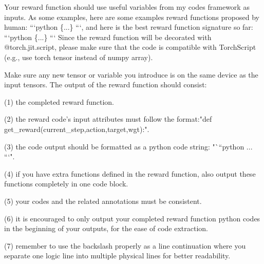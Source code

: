 \documentclass[11pt]{article}
\begin{document}
\begin{tcolorbox}[title=Prompt 2: Code Generation Instruction Prompts, colframe=blue, colback=white, breakable]

Your reward function should use useful variables from my codes framework as inputs. As some examples,
here are some examples reward functions proposed by human: ```python \{...\} ```,
and here is the best reward function signature so far: ```python \{...\} ```
Since the reward function will be decorated with @torch.jit.script,
please make sure that the code is compatible with TorchScript (e.g., use torch tensor instead of numpy array). 

Make sure any new tensor or variable you introduce is on the same device as the input tensors. 
The output of the reward function should consist:

    (1) the completed reward function.
    
    (2) the reward code's input attributes must follow the format:"def get\_reward(current\_step,action,target,wgt):".
    
    (3) the code output should be formatted as a python code string: "```python ... ```".
    
    (4) if you have extra functions defined in the reward function, also output these functions completely in one code block.
    
    (5) your codes and the related annotations must be consistent.
    
    (6) it is encouraged to only output your completed reward function python codes in the beginning of your outputs, for the ease of code extraction.
    
    (7) remember to use the backslash properly as a line continuation where you separate one logic line into multiple physical lines for better readability.
    
\end{tcolorbox}
\end{document}
